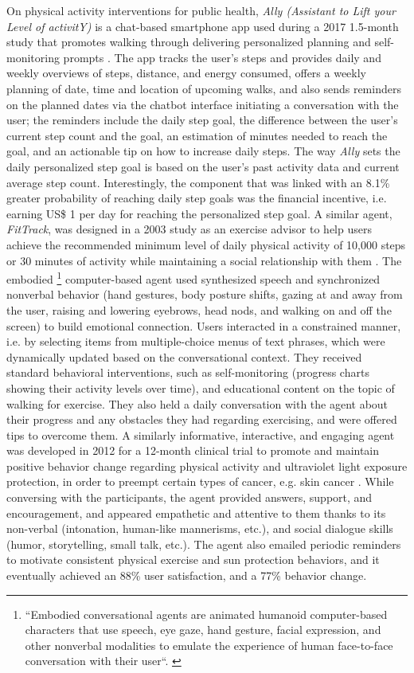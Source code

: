On physical activity interventions for public health, \textit{Ally (Assistant to Lift your Level of activitY)} is a chat-based smartphone app used during a 2017 1.5-month study that promotes walking through delivering personalized planning and self-monitoring prompts \cite{walkingincentives2020}. The app tracks the user's steps and provides daily and weekly overviews of steps, distance, and energy consumed, offers a weekly planning of date, time and location of upcoming walks, and also sends reminders on the planned dates via the chatbot interface initiating a conversation with the user; the reminders include the daily step goal, the difference between the user’s current step count and the goal, an estimation of minutes needed to reach the goal, and an actionable tip on how to increase daily steps. The way \textit{Ally} sets the daily personalized step goal is based on the user’s past activity data and current average step count. Interestingly, the component that was linked with an 8.1\% greater probability of reaching daily step goals was the financial incentive, i.e. earning US\$ 1 per day for reaching the personalized step goal. A similar agent, \textit{FitTrack}, was designed in a 2003 study as an exercise advisor to help users achieve the recommended minimum level of daily physical activity of 10,000 steps or 30 minutes of activity while maintaining a social relationship with them \cite{FitTrack2003}. The embodied \footnote{ ``Embodied conversational agents are animated humanoid computer-based characters that use speech, eye gaze, hand gesture, facial expression, and other nonverbal modalities to emulate the experience of human face-to-face conversation with their user``. \cite{cassell2001embodied}} computer-based agent used synthesized speech and synchronized nonverbal behavior (hand gestures, body posture shifts, gazing at and away from the user, raising and lowering eyebrows, head nods, and walking on and off the screen) to build emotional connection. Users interacted in a constrained manner, i.e. by selecting items from multiple-choice menus of text phrases, which were dynamically updated based on the conversational context. They received standard behavioral interventions, such as self-monitoring (progress charts showing their activity levels over time), and educational content on the topic of walking for exercise. They also held a daily conversation with the agent about their progress and any obstacles they had regarding exercising, and were offered tips to overcome them. A similarly informative, interactive, and engaging agent was developed in 2012 for a 12-month clinical trial to promote and maintain positive behavior change regarding physical activity and ultraviolet light exposure protection, in order to preempt certain types of cancer, e.g. skin cancer \cite{exerciseandsun2018}. While conversing with the participants, the agent provided answers, support, and encouragement, and appeared empathetic and attentive to them thanks to its non-verbal (intonation, human-like mannerisms, etc.), and social dialogue skills (humor, storytelling, small talk, etc.). The agent also emailed periodic reminders to motivate consistent physical exercise and sun protection behaviors, and it eventually achieved an 88\% user satisfaction, and a 77\% behavior change.

